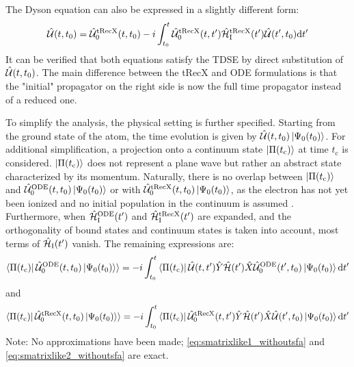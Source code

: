 The Dyson equation can also be expressed in a slightly different form:
\begin{equation}
    \hat{\mathcal{U}}(t,t_0)=\hat{\mathcal{U}}^{\mathrm{tRecX}}_0(t,t_0)-i\int_{t_0}^{t} \hat{\mathcal{U}}^{\mathrm{tRecX}}_0(t,t')\hat{\mathcal{H}}^{\mathrm{tRecX}}_{\mathrm{I}}(t')\hat{\mathcal{U}}(t',t_0) \mathrm{d} t'       \label{eq:dysonAnsatztRecX}
\end{equation}
It can be verified that both equations satisfy the TDSE by direct substitution of $\hat{\mathcal{U}}(t,t_0)$.
The main difference between the tRecX and ODE formulations is that the "initial" propagator on the right side is now the full time propagator instead of a reduced one.

To simplify the analysis, the physical setting is further specified.
Starting from the ground state of the atom, the time evolution is given by $\hat{\mathcal{U}}(t,t_0)\ket{\Psi_0(t_0)}$.
For additional simplification, a projection onto a continuum state $\ket{\Pi(t_{\mathrm{c}})}$ at time $t_{\mathrm{c}}$ is considered.
$\ket{\Pi(t_{\mathrm{c}})}$ does not represent a plane wave but rather an abstract state characterized by its momentum.
Naturally, there is no overlap between $\ket{\Pi(t_{\mathrm{c}})}$ and $\hat{\mathcal{U}}^{\mathrm{ODE}}_0(t,t_0)\ket{\Psi_0(t_0)}$ or with $\hat{\mathcal{U}}^{\mathrm{tRecX}}_0(t,t_0)\ket{\Psi_0(t_0)}$, as the electron has not yet been ionized and no initial population in the continuum is assumed \cite{Ivanov20012005}.
Furthermore, when $\hat{\mathcal{H}}^{\mathrm{ODE}}_{\mathrm{I}}(t')$ and $\hat{\mathcal{H}}^{\mathrm{tRecX}}_{\mathrm{I}}(t')$ are expanded, and the orthogonality of bound states and continuum states is taken into account, most terms of $\hat{\mathcal{H}}_{\mathrm{I}}(t')$ vanish.
The remaining expressions are:
\begin{equation}
    \braket{\Pi(t_{\mathrm{c}})|\,\hat{\mathcal{U}}^{\mathrm{ODE}}_0(t,t_0)\ket{\Psi_0(t_0)}} = -i \int_{t_0}^{t} \bra{\Pi(t_{\mathrm{c}})} \hat{\mathcal{U}}(t,t')\hat{Y}\hat{\mathcal{H}}(t')\hat{X} \hat{\mathcal{U}}^{\mathrm{ODE}}_0(t',t_0)\ket{\Psi_0(t_0)} \mathrm{d} t' \label{eq:smatrixlike1_withoutsfa}
\end{equation}
and
\begin{equation}
    \braket{\Pi(t_{\mathrm{c}})|\,\hat{\mathcal{U}}^{\mathrm{tRecX}}_0(t,t_0)\ket{\Psi_0(t_0)}} = -i \int_{t_0}^{t} \bra{\Pi(t_{\mathrm{c}})} \hat{\mathcal{U}}^{\mathrm{tRecX}}_0(t,t')\hat{Y}\hat{\mathcal{H}}(t')\hat{X} \hat{\mathcal{U}}(t',t_0)\ket{\Psi_0(t_0)} \mathrm{d} t' \label{eq:smatrixlike2_withoutsfa}
\end{equation}
Note: No approximations have been made; \eqref{eq:smatrixlike1_withoutsfa} and \eqref{eq:smatrixlike2_withoutsfa} are exact.













